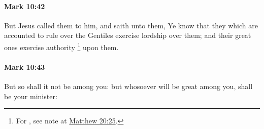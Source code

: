 		\paragraph{Mark 10:42} %
			\label{MARK-10-42}

			But Jesus called them to him, and saith unto them, Ye know that they which are accounted to rule over the Gentiles exercise lordship over them; and their great ones exercise authority%
				\footnote{%
					For , see note at \hyperref[MATTHEW-20-25]{Matthew 20:25}.
					} 
			upon them.

			\begin{framed}
			\scriptsize
				\begin{compactdesc}
					\item[SBLG] 
				\end{compactdesc}
			\end{framed}

		\paragraph{Mark 10:43} %
			\label{MARK-10-43}

			But so shall it not be among you: but whosoever will be great among you, shall be your minister:

